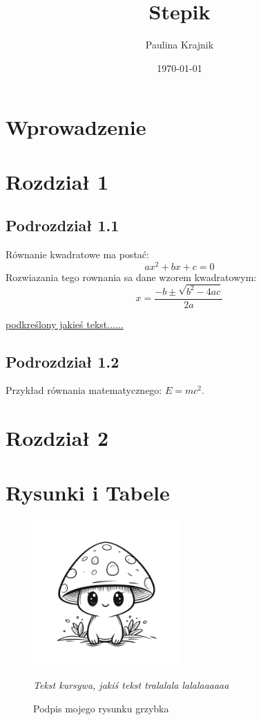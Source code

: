 \documentclass{article}
\title{Stepik}
\author{Paulina Krajnik}
\date{\today}
\begin{document}
\maketitle

\begin{abstract}
    \lipsum[1-3]
\end{abstract}

\section{Wprowadzenie}
    \lipsum[4-7]

\section{Rozdział 1}
    \subsection{Podrozdział 1.1}
	Równanie kwadratowe ma postać:
	\[ ax^2 + bx + c = 0 \]
	Rozwiazania tego rownania sa dane wzorem kwadratowym:
	\[ x = \frac{-b \pm \sqrt{b^2 - 4ac}}{2a} \]

        \underline{\lipsum[7-12]}
   	 \underline{podkreślony jakieś tekst......}

    \subsection{Podrozdział 1.2}
	\lipsum[12-15]

 	Przykład równania matematycznego: $E=mc^2$.

\section{Rozdział 2}
    \lipsum[15-23]


\section{Rysunki i Tabele}
    \begin{figure}[h]
        \centering
        \includegraphics[width=0.5\textwidth]{rysunek1.png}
        \caption{Podpis mojego rysunku grzybka}
	\textit{Tekst kursywa, jakiś tekst tralalala lalalaaaaaa}
        \label{fig:rys1}
    \end{figure}
\end{document}
